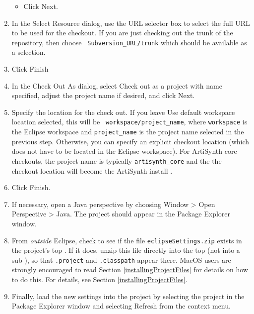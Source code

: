 \begin{enumerate}
\begin{itemize}
\item Click {\sf Next}.

\end{itemize}

\item In the {\sf Select Resource} dialog, use the {\sf URL} selector
box to select the full URL to be used for the checkout. If you are
just checking out the trunk of the repository, then choose {\tt
Subversion\_URL/trunk} which should be available as a selection.

\item Click {\sf Finish}

\item In the {\sf Check Out As} dialog, select {\sf Check out as a
project with name specified}, adjust the project name if desired,
and click {\sf Next}.

\item Specify the location for the check out. If you leave {\sf Use
default workspace location} selected, this will be {\tt
workspace/project\_name}, where {\tt workspace} is the Eclipse
workspace \directory{} and {\tt project\_name} is the project name
selected in the previous step. Otherwise, you can specify an explicit
checkout location (which does not have to be located in the Eclipse
workspace). For ArtiSynth core checkouts, the project name is
typically {\tt artisynth\_core} and the the checkout location will
become the ArtiSynth install \directory{} \ArtHome[].

\item Click {\sf Finish}.

\item If necessary, open a Java perspective by choosing {\sf Window >
Open Perspective > Java}. The project should appear in the {\sf
Package Explorer} window.

\item From {\it outside} Eclipse, check to see if the file
{\tt eclipseSettings.zip} exists in the project's top \directory{}.
If it does, unzip this file directly into the top \directory{} (not
into a sub-\directory{}), so that {\tt .project} and {\tt .classpath}
appear there.
\ifMacOS
MacOS users are strongly encouraged to read  
Section \ref{installingProjectFiles} for details on how to do this.
\else
For details, see Section \ref{installingProjectFiles}.
\fi %

\item Finally, load the new settings into the project by selecting the
project in the {\sf Package Explorer} window and selecting {\sf
Refresh} from the context menu.

\end{enumerate}

